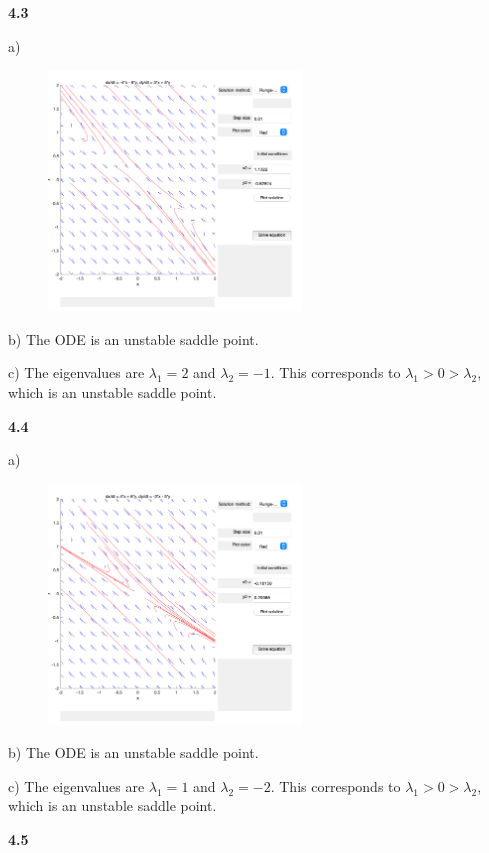 \documentclass[12pt]{article}
\begin{document}
\textbf{4.3}

a)
\begin{figure}[H]
    \centering
    \includegraphics[width=0.6\textwidth]{images/4.3.png}
\end{figure}

b) The ODE is an unstable saddle point.

c) The eigenvalues are $\lambda_1 = 2$ and $\lambda_2 = -1$. This corresponds to $\lambda_1 > 0 > \lambda_2$, which is an unstable saddle point.

\textbf{4.4}

a)\begin{figure}[H]
    \centering
    \includegraphics[width=0.6\textwidth]{images/4.4.png}
\end{figure}

b) The ODE is an unstable saddle point.

c) The eigenvalues are $\lambda_1 = 1$ and $\lambda_2 = -2$. This corresponds to $\lambda_1 > 0 > \lambda_2$, which is an unstable saddle point.

\textbf{4.5}
\end{document}
